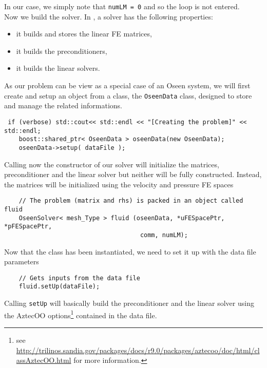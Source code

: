 \noindent In our case, we simply note that \verb|numLM = 0| and so the loop is not entered.\\

Now we build the solver. In \lifev,
a solver has the following properties:
\begin{itemize}
\item it builds and stores the linear FE matrices,
\item it builds the preconditioners,
\item it builds the linear solvers.
\end{itemize}
As our problem can be view as a special case of an Oseen system, we will first create and setup an object from a class, the \verb+OseenData+ class, designed to store and manage the related informations.

\begin{verbatim}
 if (verbose) std::cout<< std::endl << "[Creating the problem]" << std::endl;
    boost::shared_ptr< OseenData > oseenData(new OseenData);
    oseenData->setup( dataFile );
\end{verbatim}    


Calling now the constructor of our solver will initialize the matrices, preconditioner and the linear solver
but neither will be fully constructed. Instead, the matrices will be initialized using the
velocity and pressure FE spaces


\begin{verbatim}
    // The problem (matrix and rhs) is packed in an object called fluid
    OseenSolver< mesh_Type > fluid (oseenData, *uFESpacePtr, *pFESpacePtr,
                                     comm, numLM);                       
\end{verbatim}

Now that the class has been instantiated, we need to set it up with the data file parameters

\begin{verbatim}
    // Gets inputs from the data file
    fluid.setUp(dataFile);
\end{verbatim}
    
\noindent Calling \verb|setUp|
will basically build the preconditioner and the linear solver using the AztecOO 
options\footnote{see \url{http://trilinos.sandia.gov/packages/docs/r9.0/packages/aztecoo/doc/html/classAztecOO.html} for more information.}
contained in the data file.   


